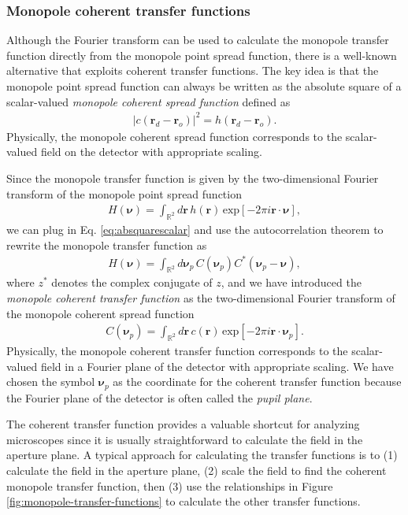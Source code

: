 \documentclass[]{osa-article}
\providecommand{\mb}[1]{\mathbf{#1}}
\providecommand{\ro}{\mathbf{\mathbf{r}}_o}
\providecommand{\rd}{\mathbf{r}_d}
\providecommand{\mbb}[1]{\mathbb{#1}}
\providecommand{\bs}[1]{\boldsymbol{#1}}
\providecommand{\bv}{\bs{\nu}}
\providecommand{\bvp}{\bs{\nu}_p}
\begin{document}
\subsubsection{Monopole coherent transfer functions}
Although the Fourier transform can be used to calculate the monopole transfer
function directly from the monopole point spread function, there is a well-known
alternative that exploits coherent transfer functions. The key idea is that the
monopole point spread function can always be written as the absolute square of a
scalar-valued \textit{monopole coherent spread function} defined as
\begin{align}
  |c(\rd - \ro)|^2 = h(\rd - \ro). \label{eq:absquarescalar}
\end{align}
Physically, the monopole coherent spread function corresponds to the
scalar-valued field on the detector with appropriate scaling.

Since the monopole transfer function is given by the two-dimensional Fourier
transform of the monopole point spread function
\begin{align}
  H(\bv) = \int_{\mbb{R}^2}d\mb{r}\,h(\mb{r})\,\text{exp}[-2\pi i\mb{r}\cdot\bv],
\end{align}
we can plug in Eq. \ref{eq:absquarescalar} and use the autocorrelation theorem to
rewrite the monopole transfer function as
\begin{align}
  H(\bv) = \int_{\mbb{R}^2}d\bvp\, C(\bvp)C^*(\bvp - \bv), 
\end{align}
where $z^*$ denotes the complex conjugate of $z$, and we have introduced the
\textit{monopole coherent transfer function} as the two-dimensional Fourier
transform of the monopole coherent spread function
\begin{align}
  C(\bvp) = \int_{\mbb{R}^2}d\mb{r}\, c(\mb{r})\,\text{exp}[-2\pi i\mb{r}\cdot\bvp].
\end{align}
Physically, the monopole coherent transfer function corresponds to the
scalar-valued field in a Fourier plane of the detector with appropriate scaling.
We have chosen the symbol $\bvp$ as the coordinate for the coherent
transfer function because the Fourier plane of the detector is often called the
\textit{pupil plane}.

The coherent transfer function provides a valuable shortcut for analyzing
microscopes since it is usually straightforward to calculate the field in the
aperture plane. A typical approach for calculating the transfer functions is to
(1) calculate the field in the aperture plane, (2) scale the field to find the
coherent monopole transfer function, then (3) use the relationships in Figure
\ref{fig:monopole-transfer-functions} to calculate the other transfer functions.
\end{document}
